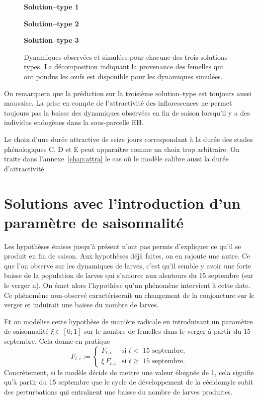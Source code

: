 \begin{figure}[ht]
 \centering
 
  \centering
 \textbf{Solution--type 1}
 
 
 \textbf{Solution--type 2}
 
 
 \textbf{Solution--type 3}
 
 
 
 \caption{Dynamiques observées et simulées pour chacune des trois solutions--types. La décomposition indiquant la provenance des femelles qui ont pondus les œufs est disponible pour les dynamiques simulées.}
 \label{fig:C}
\end{figure}


On remarquera que la prédiction sur la troisième solution--type est toujours aussi mauvaise.
La prise en compte de l'attractivité des inflorescences ne permet toujours pas la baisse des dynamiques observées en fin de saison lorsqu'il y a des individus endogènes dans la sous-parcelle EH.

Le choix d'une durée attractive de seize jours correspondant à la durée des stades phénologiques C, D et E peut apparaître comme un choix trop arbitraire.
On traite dans l'annexe~\ref{chap:attra} le cas où le modèle calibre aussi la durée d'attractivité.

\clearpage
\section{Solutions avec l'introduction d'un paramètre de saisonnalité}

Les hypothèses émises jusqu'à présent n'ont pas permis d'expliquer ce qu'il se produit en fin de saison.
Aux hypothèses déjà faites, on en rajoute une autre.
Ce que l'on observe sur les dynamiques de larves, c'est qu'il semble y avoir une forte baisse de la population de larves qui s'amorce aux alentours du 15 septembre (sur le verger n).
On émet alors l'hypothèse qu'un phénomène intervient à cette date.
Ce phénomène non-observé caractériserait un changement de la conjoncture sur le verger et induirait une baisse du nombre de larves.

Et on modélise cette hypothèse de manière radicale en introduisant un paramètre de saisonnalité $\xi \in [0;1]$ sur le nombre de femelles dans le verger à partir du 15 septembre.
Cela donne en pratique
\[
F_{t,i} := \begin{cases}
            F_{t, i} & \text{si $t<$ 15 septembre,}\\
            \xi \, F_{t, i} & \text{si $t\geq$ 15 septembre.}
           \end{cases}
\]
Concrètement, si le modèle décide de mettre une valeur éloignée de 1, cela signifie qu'à partir du 15 septembre que le cycle de développement de la cécidomyie subit des perturbations qui entraînent une baisse du nombre de larves produites.

